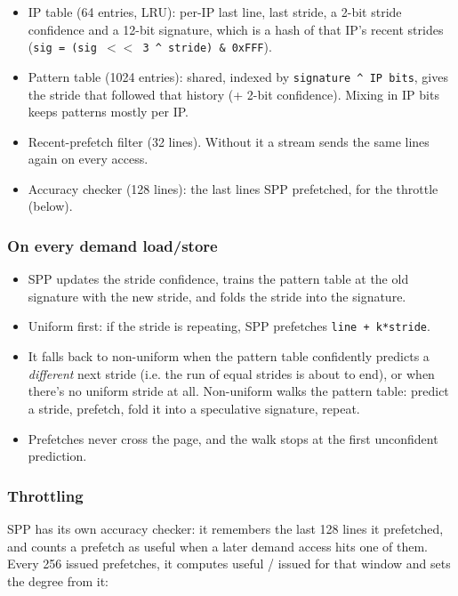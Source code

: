 \documentclass[10pt]{article}
\providecommand{\tightlist}{%
  \setlength{\itemsep}{2pt}\setlength{\parskip}{0pt}}
\begin{document}
\begin{itemize}
\tightlist
\item IP table (64 entries, LRU): per-IP last line, last stride, a 2-bit stride confidence and a 12-bit signature, which is a hash of that IP's recent strides (\texttt{sig = (sig $<$$<$ 3 \textasciicircum{} stride) \& 0xFFF}).
\item Pattern table (1024 entries): shared, indexed by \texttt{signature \textasciicircum{} IP bits}, gives the stride that followed that history (+ 2-bit confidence). Mixing in IP bits keeps patterns mostly per IP.
\item Recent-prefetch filter (32 lines). Without it a stream sends the same lines again on every access.
\item Accuracy checker (128 lines): the last lines SPP prefetched, for the throttle (below).
\end{itemize}

\subsubsection{On every demand load/store}

\begin{itemize}
\tightlist
\item SPP updates the stride confidence, trains the pattern table at the old signature with the new stride, and folds the stride into the signature.
\item Uniform first: if the stride is repeating, SPP prefetches \texttt{line + k*stride}.
\item It falls back to non-uniform when the pattern table confidently predicts a \emph{different} next stride (i.e. the run of equal strides is about to end), or when there's no uniform stride at all. Non-uniform walks the pattern table: predict a stride, prefetch, fold it into a speculative signature, repeat.
\item Prefetches never cross the page, and the walk stops at the first unconfident prediction.
\end{itemize}

\subsubsection{Throttling}

SPP has its own accuracy checker: it remembers the last 128 lines it prefetched, and counts a prefetch as useful when a later demand access hits one of them. Every 256 issued prefetches, it computes useful / issued for that window and sets the degree from it:
\end{document}
